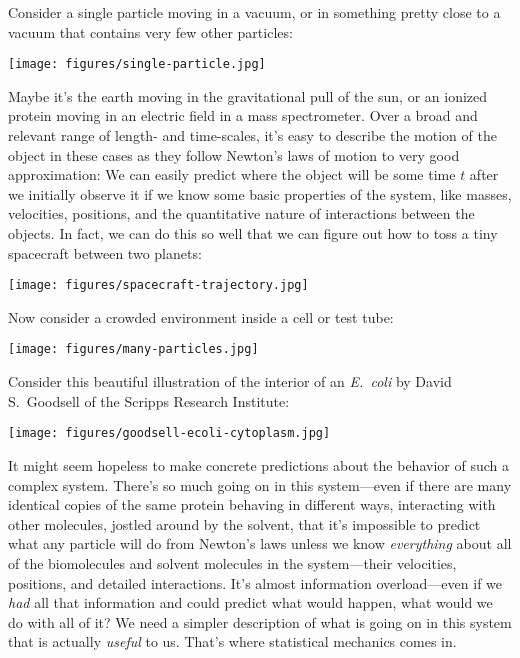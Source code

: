 \documentclass[english,course]{lecture}
\begin{document}
Consider a single particle moving in a vacuum, or in something pretty close to a vacuum that contains very few other particles:

\begin{centering}
\texttt{[image: figures/single-particle.jpg]}

\end{centering}

Maybe it's the earth moving in the gravitational pull of the sun, or an ionized protein moving in an electric field in a mass spectrometer.
Over a broad and relevant range of length- and time-scales, it's easy to describe the motion of the object in these cases as they follow Newton's laws of motion to very good approximation: We can easily predict where the object will be some time $t$ after we initially observe it if we know some basic properties of the system, like masses, velocities, positions, and the quantitative nature of interactions between the objects.
In fact, we can do this so well that we can figure out how to toss a tiny spacecraft between two planets:

\begin{centering}
\texttt{[image: figures/spacecraft-trajectory.jpg]}

\end{centering}

Now consider a crowded environment inside a cell or test tube: 

\begin{centering}
\texttt{[image: figures/many-particles.jpg]}

\end{centering}

Consider this beautiful illustration of the interior of an \emph{E.~coli} by David S.\ Goodsell of the Scripps Research Institute:

\begin{centering}
\texttt{[image: figures/goodsell-ecoli-cytoplasm.jpg]}

\end{centering}

It might seem hopeless to make concrete predictions about the behavior of such a complex system.
There's so much going on in this system---even if there are many identical copies of the same protein behaving in different ways, interacting with other molecules, jostled around by the solvent, that it's impossible to predict what any particle will do from Newton's laws unless we know \emph{everything} about all of the biomolecules and solvent molecules in the system---their velocities, positions, and detailed interactions.
It's almost information overload---even if we \emph{had} all that information and could predict what would happen, what would we do with all of it?
We need a simpler description of what is going on in this system that is actually \emph{useful} to us.
That's where statistical mechanics comes in.
\end{document}
